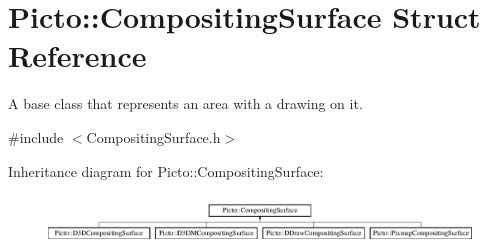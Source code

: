 \hypertarget{struct_picto_1_1_compositing_surface}{\section{Picto\-:\-:Compositing\-Surface Struct Reference}
\label{struct_picto_1_1_compositing_surface}
}


A base class that represents an area with a drawing on it.  




{\ttfamily \#include $<$Compositing\-Surface.\-h$>$}

Inheritance diagram for Picto\-:\-:Compositing\-Surface\-:\begin{figure}[H]
\begin{center}
\leavevmode
\includegraphics[height=1.352657cm]{struct_picto_1_1_compositing_surface}
\end{center}
\end{figure}
